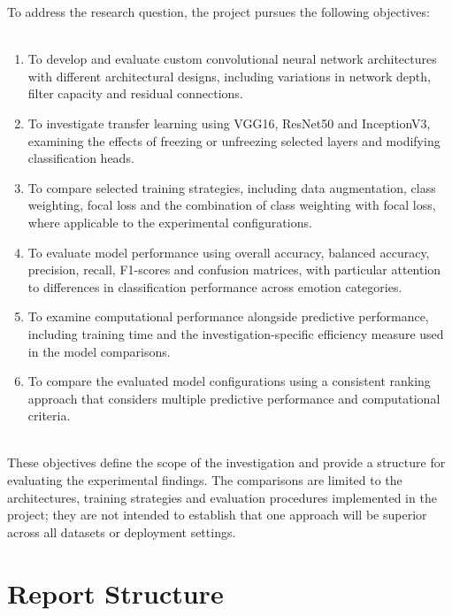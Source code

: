 \documentclass[12pt, a4paper]{report}
\let\oldsection\section
\renewcommand{\section}{%
    \Needspace{6\baselineskip}%
    \oldsection
}
\begin{document}
			To address the research question, the project pursues the following objectives:\\\\
			\begin{enumerate}
				\item To develop and evaluate custom convolutional neural network architectures with different architectural designs, including variations in network depth, filter capacity and residual connections.\\
				\item To investigate transfer learning using VGG16, ResNet50 and InceptionV3, examining the effects of freezing or unfreezing selected layers and modifying classification heads.\\
				\item To compare selected training strategies, including data augmentation, class weighting, focal loss and the combination of class weighting with focal loss, where applicable to the experimental configurations.\\
				\item To evaluate model performance using overall accuracy, balanced accuracy, precision, recall, F1-scores and confusion matrices, with particular attention to differences in classification performance across emotion categories.\\
				\item To examine computational performance alongside predictive performance, including training time and the investigation-specific efficiency measure used in the model comparisons.\\
				\item To compare the evaluated model configurations using a consistent ranking approach that considers multiple predictive performance and computational criteria.\\\\
			\end{enumerate}
			These objectives define the scope of the investigation and provide a structure for evaluating the experimental findings. The comparisons are limited to the architectures, training strategies and evaluation procedures implemented in the project; they are not intended to establish that one approach will be superior across all datasets or deployment settings.
			
		\newpage
		\section{Report Structure}
			
\end{document}
